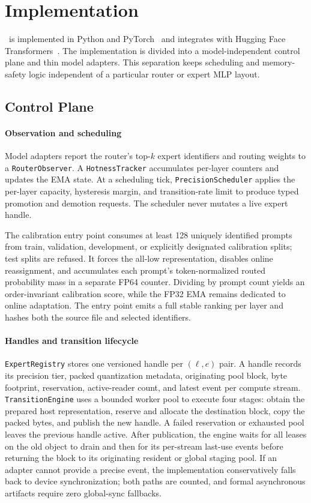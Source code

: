 \section{Implementation}
\label{sec:impl}

\systemname\ is implemented in Python and PyTorch~\cite{paszke2019pytorch} and integrates with Hugging Face Transformers~\cite{wolf2020transformers}. The implementation is divided into a model-independent control plane and thin model adapters. This separation keeps scheduling and memory-safety logic independent of a particular router or expert MLP layout.

\subsection{Control Plane}

\paragraph{Observation and scheduling}
Model adapters report the router's top-$k$ expert identifiers and routing weights to a \texttt{RouterObserver}. A \texttt{HotnessTracker} accumulates per-layer counters and updates the EMA state. At a scheduling tick, \texttt{PrecisionScheduler} applies the per-layer capacity, hysteresis margin, and transition-rate limit to produce typed promotion and demotion requests. The scheduler never mutates a live expert handle.

The calibration entry point consumes at least 128 uniquely identified prompts from train, validation, development, or explicitly designated calibration splits; test splits are refused. It forces the all-low representation, disables online reassignment, and accumulates each prompt's token-normalized routed probability mass in a separate FP64 counter. Dividing by prompt count yields an order-invariant calibration score, while the FP32 EMA remains dedicated to online adaptation. The entry point emits a full stable ranking per layer and hashes both the source file and selected identifiers.

\paragraph{Handles and transition lifecycle}
\texttt{ExpertRegistry} stores one versioned handle per $(\ell,e)$ pair. A handle records its precision tier, packed quantization metadata, originating pool block, byte footprint, reservation, active-reader count, and latest event per compute stream. \texttt{TransitionEngine} uses a bounded worker pool to execute four stages: obtain the prepared host representation, reserve and allocate the destination block, copy the packed bytes, and publish the new handle. A failed reservation or exhausted pool leaves the previous handle active. After publication, the engine waits for all leases on the old object to drain and then for its per-stream last-use events before returning the block to its originating resident or global staging pool. If an adapter cannot provide a precise event, the implementation conservatively falls back to device synchronization; both paths are counted, and formal asynchronous artifacts require zero global-sync fallbacks.

